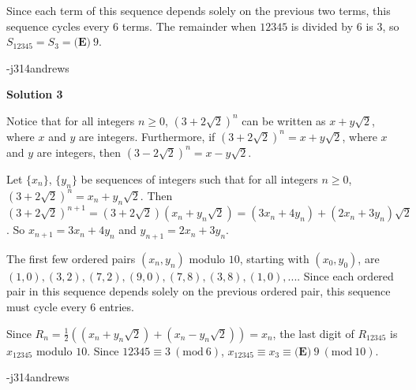 \begin{enumerate}
 Since each term of this sequence depends solely on the previous two terms, this sequence cycles every $6$ terms.  The remainder when $12345$ is divided by $6$ is $3$, so $S_{12345} = S_3 = \boxed{\textbf{(E)}\ 9}$.

 -j314andrews

 



\textbf{Solution 3}

Notice that for all integers $n \geq 0$, $\left(3 + 2\sqrt{2}\right)^n$ can be written as $x + y\sqrt{2}$, where $x$ and $y$ are integers.  Furthermore, if $\left(3 + 2\sqrt{2}\right)^n = x + y\sqrt{2}$, where $x$ and $y$ are integers, then $\left(3 - 2\sqrt{2}\right)^n = x - y\sqrt{2}$.

 Let $\{x_n\}$, $\{y_n\}$ be sequences of integers such that for all integers $n \geq 0$, $\left(3 + 2\sqrt{2}\right)^n = x_n + y_n\sqrt{2}$.  Then $\left(3 + 2\sqrt{2}\right)^{n+1} = \left(3 + 2\sqrt{2}\right)\left(x_n + y_n\sqrt{2}\right) = (3x_n + 4y_n) + (2x_n + 3y_n)\sqrt{2}$.  So $x_{n+1} = 3x_n + 4y_n$ and $y_{n+1} = 2x_n + 3y_n$.  

 The first few ordered pairs $(x_n, y_n)$ modulo $10$, starting with $(x_0, y_0)$, are $(1, 0), (3, 2), (7, 2), (9, 0), (7, 8), (3, 8), (1, 0), ...$.  Since each ordered pair in this sequence depends solely on the previous ordered pair, this sequence must cycle every $6$ entries.

 Since $R_n = \frac{1}{2}\left((x_n + y_n \sqrt{2}) + (x_n - y_n \sqrt{2})\right) = x_n$, the last digit of $R_{12345}$ is $x_{12345}$ modulo $10$.  Since $12345 \equiv 3\ (\text{mod}\ 6)$, $x_{12345} \equiv x_{3} \equiv \boxed{\textbf{(E)}\ 9}\ (\text{mod}\ 10)$.

 -j314andrews

 


\end{enumerate}
